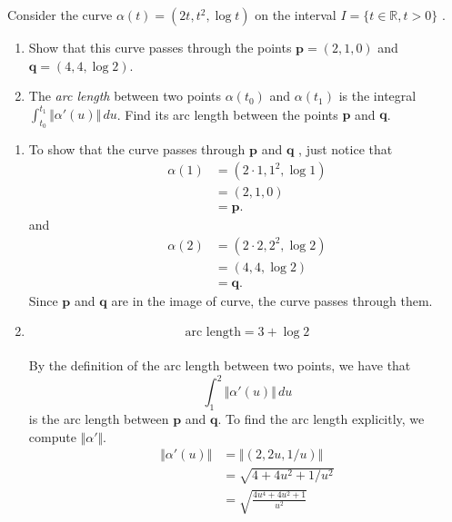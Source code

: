 \documentclass[12 pt, letterpaper]{hmcpset}
\begin{document}
\pagebreak

\begin{problem}[Problem 3]
	Consider the curve $\alpha(t) = (2t, t^{2}, \log t)$ on the interval $I = \{ t \in \mathbb{R}, t > 0 \}$ .
	\begin{enumerate}
		\item Show that this curve passes through the points $\mathbf{p} = (2, 1, 0)$ and $\mathbf{q} = (4, 4, \log 2)$.
		\item The \textit{arc length} between two points $\alpha(t_{0})$ and $\alpha(t_{1})$ is the integral $\int_{t_{0}}^{t_{1}} \Vert \alpha'(u) \Vert \, du$. Find its arc length between the points $\mathbf{p}$ and $\mathbf{q}$.
	\end{enumerate}
\end{problem}

\begin{solution}
	\begin{enumerate}
		\item To show that the curve passes through $\mathbf{p}$  and $\mathbf{q}$ , just notice that
			 \[
				\begin{split}
					\alpha(1) & = (2 \cdot 1, 1^{2}, \log 1) \\
						  & = (2, 1, 0) \\
						  & = \mathbf{p}.
				\end{split}	
			\]
			and
			\[
				\begin{split}
					\alpha(2) & = (2 \cdot 2, 2^{2}, \log 2) \\
						  & = (4, 4, \log 2) \\
						  & = \mathbf{q}.
				\end{split}
			\]
			Since $\mathbf{p}$ and $\mathbf{q}$ are in the image of curve, the curve passes through them.
		\item 
			\[
				\boxed{
					\text{arc length} = 3 + \log 2
				}
			\] \\
			By the definition of the arc length between two points, we have that
			\[
				\int_{1}^{2} \Vert \alpha'(u) \Vert \, du
			\]
			is the arc length between $\mathbf{p}$ and $\mathbf{q}$. To find the arc length explicitly, we compute $\Vert \alpha' \Vert$.
			\[
				\begin{split}
					\Vert \alpha'(u) \Vert & = \Vert (2, 2u, 1/u) \Vert \\
							       & = \sqrt{4 + 4u^{2} + 1/u^{2}} \\
							       & = \sqrt{\frac{4u^{4} + 4u^{2} + 1}{u^{2}}} \\

\end{split}\]
\end{enumerate}
\end{solution}
\end{document}
